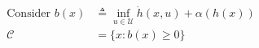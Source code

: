 \documentclass[preview]{standalone}
\begin{document}
\begin{align*}
\text{Consider }b(x) &\triangleq \inf_{u \in \mathcal{U}} \dot h(x, u) + \alpha(h(x))\\ \mathcal{C} &= \{ x : b(x) \geq 0 \}
\end{align*}
\end{document}
